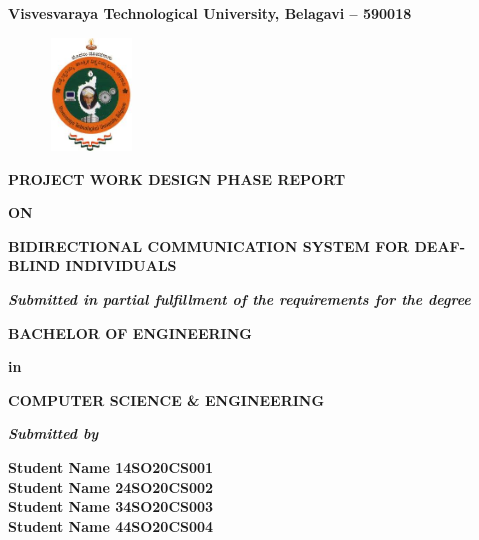 \documentclass[12pt,a4paper]{report}
\begin{document}
\pagestyle{empty}
\begin{center}

{\large \textbf{Visvesvaraya Technological University, Belagavi – 590018}}
\begin{figure}[hbtp]
\centering
\includegraphics[width=2.3cm,height=3cm]{./pic/vtu}
\end{figure}

\textbf{PROJECT WORK DESIGN PHASE REPORT}
\par
\textbf{ON}
\par
\vspace{6pt}
{\Large \textbf{BIDIRECTIONAL COMMUNICATION SYSTEM FOR DEAF-BLIND INDIVIDUALS}}
\par
\vspace{12pt}
\par
\textit{\textbf{Submitted in partial fulfillment of the requirements for the degree }}
\par
\vspace{12pt}
\large \textbf{BACHELOR OF ENGINEERING }
\par
\textbf{in}
\par
\large \textbf{COMPUTER SCIENCE \& ENGINEERING}
\par
\vspace{12pt}
\textit{\textbf{Submitted by}}
\vspace{8pt}

\textbf{\large Student Name 1}\qquad \qquad \qquad \qquad \textbf{\large 4SO20CS001}\\ \vspace{3pt} 
\textbf{\large Student Name 2}\qquad \qquad \qquad \qquad \textbf{\large 4SO20CS002}\\ \vspace{3pt}
\textbf{\large Student Name 3}\qquad \qquad \qquad \qquad \textbf{\large 4SO20CS003}\\ \vspace{3pt}
\textbf{\large Student Name 4}\qquad \qquad \qquad \qquad \textbf{\large 4SO20CS004}\\ \vspace{3pt}


\end{center}
\end{document}
